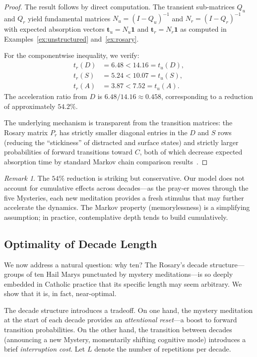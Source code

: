 \documentclass[journal]{IEEEtran}
\theoremstyle{definition}
\theoremstyle{remark}
\newtheorem{remark}[theorem]{Remark}
\begin{document}
\begin{proof}
The result follows by direct computation. The transient sub-matrices $Q_u$ and $Q_r$ yield fundamental matrices $N_u = (I - Q_u)^{-1}$ and $N_r = (I - Q_r)^{-1}$ with expected absorption vectors $\mathbf{t}_u = N_u \mathbf{1}$ and $\mathbf{t}_r = N_r \mathbf{1}$ as computed in Examples~\ref{ex:unstructured} and~\ref{ex:rosary}.

For the componentwise inequality, we verify:
\begin{align*}
t_r(D) &= 6.48 < 14.16 = t_u(D), \\
t_r(S) &= 5.24 < 10.07 = t_u(S), \\
t_r(A) &= 3.87 < 7.52 = t_u(A).
\end{align*}
The acceleration ratio from $D$ is $6.48/14.16 \approx 0.458$, corresponding to a reduction of approximately $54.2\%$.

The underlying mechanism is transparent from the transition matrices: the Rosary matrix $P_r$ has strictly smaller diagonal entries in the $D$ and $S$ rows (reducing the ``stickiness'' of distracted and surface states) and strictly larger probabilities of forward transitions toward $C$, both of which decrease expected absorption time by standard Markov chain comparison results~\cite{kemeny1976}.
\end{proof}

\begin{remark}
The $54\%$ reduction is striking but conservative. Our model does not account for cumulative effects across decades---as the pray-er moves through the five Mysteries, each new meditation provides a fresh stimulus that may further accelerate the dynamics. The Markov property (memorylessness) is a simplifying assumption; in practice, contemplative depth tends to build cumulatively.
\end{remark}

\subsection{Optimality of Decade Length}\label{sec:optimality}

We now address a natural question: why ten? The Rosary's decade structure---groups of ten Hail Marys punctuated by mystery meditations---is so deeply embedded in Catholic practice that its specific length may seem arbitrary. We show that it is, in fact, near-optimal.

The decade structure introduces a tradeoff. On one hand, the mystery meditation at the start of each decade provides an \emph{attentional reset}---a boost to forward transition probabilities. On the other hand, the transition between decades (announcing a new Mystery, momentarily shifting cognitive mode) introduces a brief \emph{interruption cost}. Let $L$ denote the number of repetitions per decade.
\end{document}

